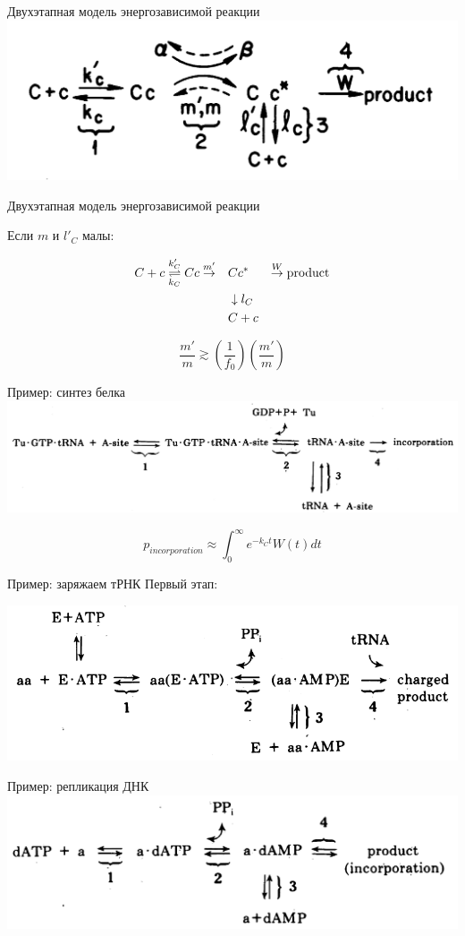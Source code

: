 \documentclass{beamer}
\begin{document}
\begin{frame}{Двухэтапная модель энергозависимой реакции}
    \centering \includegraphics[width=\textwidth]{reaction8}
\end{frame}

\begin{frame}{Двухэтапная модель энергозависимой реакции} %

Если $ m $ и $ l'_C $ малы:

\begin{align*}
    C + c \overunderset{k'_C}{k_C}{\rightleftharpoons} Cc \overset{m'}{\rightarrow} \quad & Cc^* & \overset{W}\to \text{product} \\
    & \downarrow l_C & \\
    & C+c &
\end{align*}

\[ \frac{m'}{m} \gtrsim \left( \frac{1}{f_0} \right) \left( \frac{m'}{m} \right) \]

\end{frame}

\begin{frame}{Пример: синтез белка }
\centering \includegraphics[width=\textwidth]{reaction_rna2protein}

\[ p_{incorporation} \approx \int_{0}^{\infty} e^{-k_C t} W(t) dt \]

\end{frame}

\begin{frame}{Пример: заряжаем тРНК}
Первый этап:

\centering \includegraphics[width=.7\textwidth]{reaction_trna}

\end{frame}

\begin{frame}{Пример: репликация ДНК}
    \centering \includegraphics[width=.7\textwidth]{reaction_dna}

\end{frame}
\end{document}

